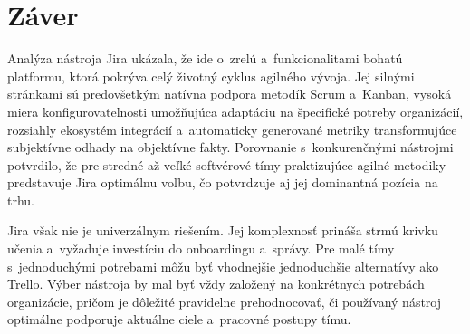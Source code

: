 
\chapter{Záver}\label{ch:summary}

Analýza nástroja Jira ukázala, že ide o~zrelú a~funkcionalitami bohatú platformu, ktorá pokrýva celý životný cyklus agilného vývoja. Jej silnými stránkami sú predovšetkým natívna podpora metodík Scrum a~Kanban, vysoká miera konfigurovateľnosti umožňujúca adaptáciu na špecifické potreby organizácií, rozsiahly ekosystém integrácií a~automaticky generované metriky transformujúce subjektívne odhady na objektívne fakty. Porovnanie s~konkurenčnými nástrojmi potvrdilo, že pre stredné až veľké softvérové tímy praktizujúce agilné metodiky predstavuje Jira optimálnu voľbu, čo potvrdzuje aj jej dominantná pozícia na trhu.

Jira však nie je univerzálnym riešením. Jej komplexnosť prináša strmú krivku učenia a~vyžaduje investíciu do onboardingu a~správy. Pre malé tímy s~jednoduchými potrebami môžu byť vhodnejšie jednoduchšie alternatívy ako Trello. Výber nástroja by mal byť vždy založený na konkrétnych potrebách organizácie, pričom je dôležité pravidelne prehodnocovať, či používaný nástroj optimálne podporuje aktuálne ciele a~pracovné postupy tímu.

